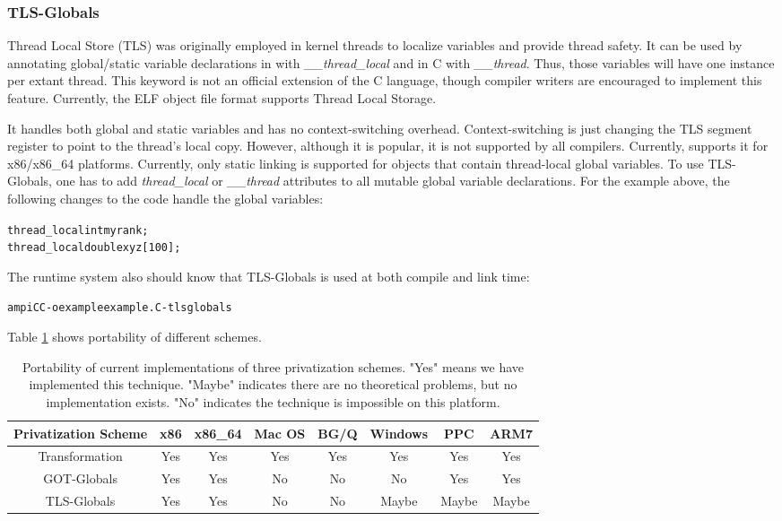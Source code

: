 \documentclass[10pt]{article}
\begin{document}
\subsubsection{TLS-Globals}
Thread Local Store (TLS) was originally employed in kernel threads to
localize variables and provide thread safety. It can be used by annotating
global/static variable declarations in \CC{} with \emph{\_\_thread\_local}
and in C with \emph{\_\_thread}. Thus, those variables will have one instance
per extant thread. This keyword is not an official extension of the C language,
though compiler writers are encouraged to implement this feature. Currently,
the ELF object file format supports Thread Local Storage.

It handles both global and static variables and has no context-switching
overhead. Context-switching is just changing the TLS segment register
to point to the thread's local copy. However, although it is popular, it
is not supported by all compilers. Currently, \charmpp{} supports it for x86/x86\_64 platforms.
Currently, only static linking is supported for objects that contain thread-local global variables.
To use TLS-Globals, one has to add \emph{thread\_local} or \emph{\_\_thread} attributes
to all mutable global variable declarations. For the example above, the following changes to
the code handle the global variables:
\begin{alltt}
thread_local int myrank;
thread_local double xyz[100];
\end{alltt}

The runtime system also should know that TLS-Globals is used at both compile and link time:

\begin{alltt}
ampiCC -o example example.C -tlsglobals
\end{alltt}
Table \ref{tab:portability} shows portability of different schemes.

\begin{table}[!tb]
\begin{center}
\begin{tabular}{|c||c|c|c|c|c|c|c|}
\hline
Privatization Scheme     & x86     & x86\_64  & Mac OS & BG/Q  & Windows & PPC   & ARM7  \\
\hline
\hline
Transformation           & Yes     & Yes     & Yes     & Yes   & Yes     & Yes   & Yes   \\
\hline
GOT-Globals              & Yes     & Yes     & No      & No    & No      & Yes   & Yes   \\
\hline
TLS-Globals              & Yes     & Yes     & No      & No    & Maybe   & Maybe & Maybe \\
\hline
\end{tabular}
\caption{Portability of current implementations of three privatization schemes.
"Yes" means we have implemented this technique.
"Maybe" indicates there are no theoretical problems, but no implementation exists.
"No" indicates the technique is impossible on this platform.}
\label{tab:portability}
\vspace{-1.0cm}
\end{center}
\end{table}
\end{document}
